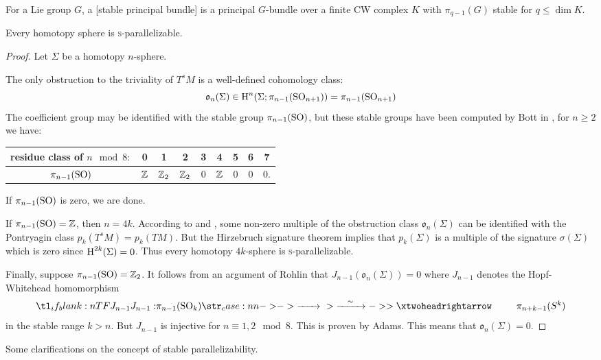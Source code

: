 \begin{definition}
	For a Lie group $G$, a [stable principal bundle] is a principal $G$-bundle over a finite CW complex $K$ with $\pi_{q-1}(G)$ stable for $q \leq \dim K$.
\end{definition}

\begin{theorem}
	Every homotopy sphere is \textsc{s}-parallelizable.
\end{theorem}

\begin{proof}
	Let $\Sigma$ be a homotopy $n$-sphere.

	The only obstruction to the triviality of $T^sM$ is a well-defined cohomology class:
	\[
		\mathfrak{o}_n(\Sigma) \in \operatorname{H}^n(\Sigma; \pi_{n-1}(\operatorname{SO}_{n+1})) = \pi_{n-1}(\operatorname{SO}_{n+1})
	\]
	The coefficient group may be identified with the stable group $\pi_{n-1}(\operatorname{SO})$, but these stable groups have been computed by Bott in \cite{bott1957}, for $n\geq 2$ we have:
	\begin{center}
		\begin{tabular}{c|cccccccc}
			\textrm{residue class of $n\mod 8:$} & 0 & 1 & 2 & 3 & 4 & 5 & 6 & 7\\
			\hline
			$\pi_{n-1}(\operatorname{SO})$ & $\mathbb{Z}$ & $\mathbb{Z}_2$ & $\mathbb{Z}_2$ & 0 & $\mathbb{Z}$ & 0 & 0 & 0.
		\end{tabular}
	\end{center}
	If $\pi_{n-1}(\operatorname{SO})$ is zero, we are done. 

	If $\pi_{n-1}(\operatorname{SO}) = \mathbb{Z}$, then $n=4k$. According to \cite{kervairemilnor1960} and \cite{kervaire1959}, some non-zero multiple of the obstruction class $\mathfrak{o}_n(\Sigma)$ can be identified with the Pontryagin class $p_k(T^s M) = p_k(TM)$.  But the Hirzebruch signature theorem implies  that $p_k(\Sigma)$ is a multiple of the signature $\sigma(\Sigma)$ which is zero since $\operatorname{H}^{2k}(\Sigma)=0$. Thus every homotopy $4k$-sphere is \textsc{s}-parallelizable. 

	Finally, suppose $\pi_{n-1}(\operatorname{SO})= \mathbb{Z}_2$. It follows from an argument of Rohlin  that $J_{n-1}(\mathfrak{o}_n(\Sigma))=0$ where $J_{n-1}$ denotes the Hopf-Whitehead homomorphism
	\[
		\lkxfunc{J_{n-1}}{\pi_{n-1}(\SO_k)}{\pi_{n+k-1}(S^k)}
	\]
	in the stable range $k >n$. But $J_{n-1}$ is injective for $n\equiv 1, 2\mod 8$. This is proven by Adams.  This means that $\mathfrak{o}_n(\Sigma)=0$.
\end{proof}

Some clarifications on the concept of stable parallelizability.

